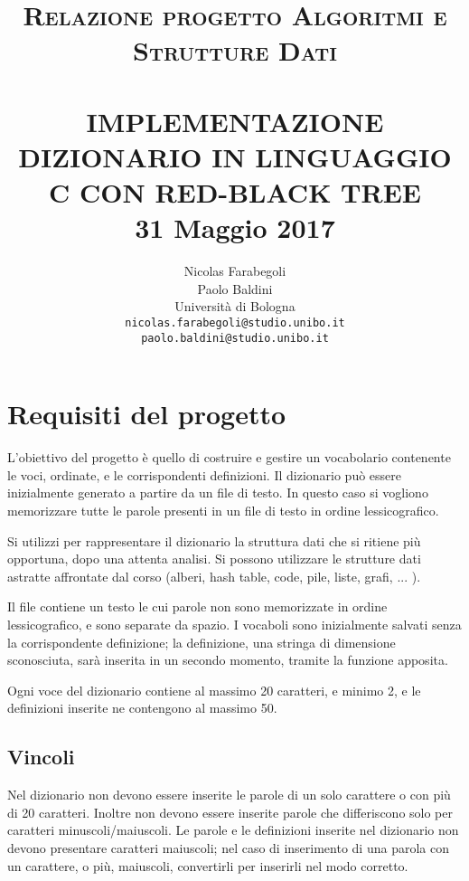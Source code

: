 \documentclass[paper=a4, fontsize=11pt,twoside]{scrartcl}   %
\title{ \normalsize \textsc{Relazione progetto Algoritmi e Strutture Dati}    %
	\\[2.0cm]                               %
	\HRule{0.5pt} \\                        %
	\LARGE \textbf{\uppercase{Implementazione dizionario in linguaggio 
			C con Red-Black Tree}}    %
	\HRule{2pt} \\ [0.5cm]      %
	\normalsize 31 Maggio 2017          %
}
\author{
	Nicolas Farabegoli\\
	Paolo Baldini\\
	Università di Bologna\\  
	\texttt{nicolas.farabegoli@studio.unibo.it} \\
	\texttt{paolo.baldini@studio.unibo.it}\\
}
\makeatletter
\def\printtitle{%
	{\centering \@title\par}}
\def\printauthor{%
	{\centering \large \@author}}
\makeatother
\begin{document}
	\thispagestyle{empty}       %
	
	\printtitle                 %
	\vfill
	\printauthor                %
	\newpage
	\tableofcontents
	\newpage
	\setcounter{page}{1}        %
	
	\section{Requisiti del progetto}
		L'obiettivo del progetto è quello di costruire e gestire un vocabolario 
		contenente le voci, ordinate, e le corrispondenti definizioni. 
		Il dizionario può essere inizialmente generato a partire da un file di testo.  
		In questo caso si vogliono memorizzare tutte le parole presenti in un file di 
		testo in ordine lessicografico.
		
		Si utilizzi per rappresentare il dizionario la struttura dati che si ritiene 
		più opportuna, dopo una attenta analisi. Si possono utilizzare le strutture 
		dati astratte affrontate dal corso (alberi, hash table, code, pile, liste, 
		grafi, ... ).
		
		Il file contiene un testo le cui parole non sono memorizzate in ordine lessicografico, e sono separate da spazio. I vocaboli sono inizialmente salvati senza la corrispondente definizione; la definizione, una stringa di dimensione sconosciuta, sarà inserita in un secondo momento, tramite la funzione apposita.
		
		Ogni voce del dizionario contiene al massimo 20 caratteri, e minimo 2, e le definizioni inserite ne contengono al massimo 50.
		
			\subsection{Vincoli}
				Nel dizionario non devono essere inserite le parole di un solo carattere o con più di 20 caratteri. Inoltre non devono essere inserite parole che differiscono solo per caratteri minuscoli/maiuscoli. Le parole e le definizioni inserite nel dizionario non devono presentare caratteri maiuscoli; nel caso di inserimento di una parola con un carattere, o più, maiuscoli, convertirli per inserirli nel modo corretto. 
				
\end{document}
